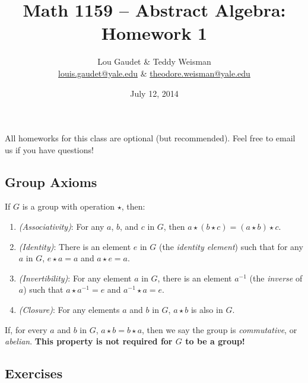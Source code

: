\documentclass[10pt, letterpaper]{article}
\begin{document}
\title{Math 1159 -- Abstract Algebra: Homework 1}
\author{Lou Gaudet \& Teddy Weisman \\ 
\url{louis.gaudet@yale.edu} \& \url{theodore.weisman@yale.edu}}
\date{July 12, 2014}
\maketitle

All homeworks for this class are optional (but recommended). Feel free
to email us if you have questions!

\subsection*{Group Axioms}
If $G$ is a group with operation $\star$, then:
\begin{enumerate}
\item \emph{(Associativity)}: For any $a$, $b$, and $c$ in $G$, then
  $a \star (b \star c) = (a \star b) \star c$.

\item \emph{(Identity)}: There is an element $e$ in $G$ (the
  \emph{identity element}) such that for any $a$ in $G$, $e \star a =
  a$ and $a \star e = a$. 

\item \emph{(Invertibility)}: For any element $a$ in $G$, there is an
  element $a^{-1}$ (the \emph{inverse} of $a$) such that $a \star
  a^{-1} = e$ and $a^{-1} \star a = e$.

\item \emph{(Closure)}: For any elements $a$ and $b$ in $G$, $a \star
  b$ is also in $G$.

\end{enumerate}

If, for every $a$ and $b$ in $G$, $a \star b = b \star a$, then we say
the group is \emph{commutative}, or \emph{abelian}. \textbf{This
  property is not required for $G$ to be a group!}

\subsection*{Exercises}
\end{document}
